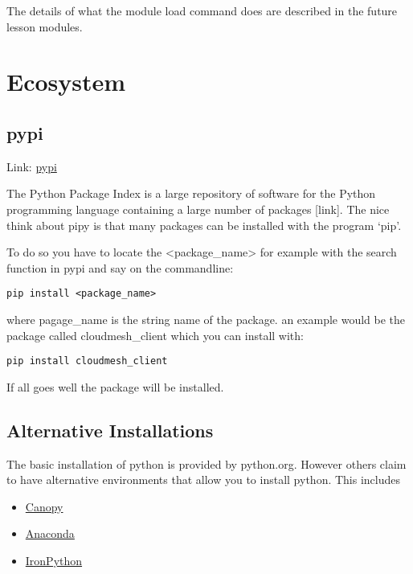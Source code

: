 The details of what the module load command does are described in the
future lesson modules.

\section{Ecosystem}\label{ecosystem}

\subsection{pypi}\label{pypi}

Link: \href{https://pypi.python.org/pypi}{pypi}

The Python Package Index is a large repository of software for the
Python programming language containing a large number of packages
{[}link{]}. The nice think about pipy is that many packages can be
installed with the program `pip'.

To do so you have to locate the \textless{}package\_name\textgreater{}
for example with the search function in pypi and say on the commandline:

\begin{verbatim}
pip install <package_name>
\end{verbatim}

where pagage\_name is the string name of the package. an example would
be the package called cloudmesh\_client which you can install with:

\begin{verbatim}
pip install cloudmesh_client
\end{verbatim}

If all goes well the package will be installed.

\subsection{Alternative Installations}\label{alternative-installations}

The basic installation of python is provided by python.org. However
others claim to have alternative environments that allow you to install
python. This includes

\begin{itemize}
\tightlist
\item
  \href{https://store.enthought.com/downloads/\#default}{Canopy}
\item
  \href{https://www.continuum.io/downloads}{Anaconda}
\item
  \href{http://ironpython.net/}{IronPython}
\end{itemize}

